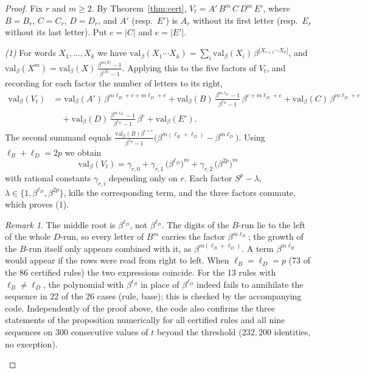 \documentclass[11pt]{article}
\theoremstyle{definition}
\theoremstyle{remark}
\newtheorem{remark}[theorem]{Remark}
\begin{document}
\begin{proof}
Fix $r$ and $m\ge 2$. By Theorem~\ref{thm:cert}, $V_t=A'\,B^m\,C\,D^m\,E'$, where $B=B_r$, $C=C_r$, $D=D_r$, and $A'$ (resp.\ $E'$) is $A_r$ without its first letter (resp.\ $E_r$ without its last letter). Put $c=|C|$ and $e=|E'|$.

\emph{(1)} For words $X_1,\dots,X_k$ we have $\mathrm{val}_\beta(X_1\cdots X_k)=\sum_{i}\mathrm{val}_\beta(X_i)\,\beta^{|X_{i+1}\cdots X_k|}$, and $\mathrm{val}_\beta(X^m)=\mathrm{val}_\beta(X)\,\frac{\beta^{m|X|}-1}{\beta^{|X|}-1}$. Applying this to the five factors of $V_t$, and recording for each factor the number of letters to its right,
\begin{align*}
\mathrm{val}_\beta(V_t)
&=\mathrm{val}_\beta(A')\,\beta^{m\ell_B+c+m\ell_D+e}
+\mathrm{val}_\beta(B)\,\frac{\beta^{m\ell_B}-1}{\beta^{\ell_B}-1}\,\beta^{c+m\ell_D+e}
+\mathrm{val}_\beta(C)\,\beta^{m\ell_D+e}\\
&\quad+\mathrm{val}_\beta(D)\,\frac{\beta^{m\ell_D}-1}{\beta^{\ell_D}-1}\,\beta^{e}
+\mathrm{val}_\beta(E').
\end{align*}
The second summand equals $\frac{\mathrm{val}_\beta(B)\beta^{c+e}}{\beta^{\ell_B}-1}\bigl(\beta^{m(\ell_B+\ell_D)}-\beta^{m\ell_D}\bigr)$. Using $\ell_B+\ell_D=2p$ we obtain
\[
\mathrm{val}_\beta(V_t)=\gamma_{r,0}+\gamma_{r,1}\,\bigl(\beta^{\ell_D}\bigr)^m+\gamma_{r,2}\,\bigl(\beta^{2p}\bigr)^m
\]
with rational constants $\gamma_{r,i}$ depending only on $r$. Each factor $S^p-\lambda$, $\lambda\in\{1,\beta^{\ell_D},\beta^{2p}\}$, kills the corresponding term, and the three factors commute, which proves (1).

\begin{remark}\label{rem:lD}
The middle root is $\beta^{\ell_D}$, not $\beta^{\ell_B}$. The digits of the $B$-run lie to the left of the whole $D$-run, so every letter of $B^m$ carries the factor $\beta^{m\ell_D}$; the growth of the $B$-run itself only appears combined with it, as $\beta^{m(\ell_B+\ell_D)}$. A term $\beta^{m\ell_B}$ would appear if the rows were read from right to left. When $\ell_B=\ell_D=p$ (73 of the 86 certified rules) the two expressions coincide. For the 13 rules with $\ell_B\neq\ell_D$, the polynomial with $\beta^{\ell_B}$ in place of $\beta^{\ell_D}$ indeed fails to annihilate the sequence in 22 of the 26 cases (rule, base); this is checked by the accompanying code. Independently of the proof above, the code also confirms the three statements of the proposition numerically for all certified rules and all nine sequences on $300$ consecutive values of $t$ beyond the threshold ($232{,}200$ identities, no exception).
\end{remark}


\end{proof}
\end{document}

